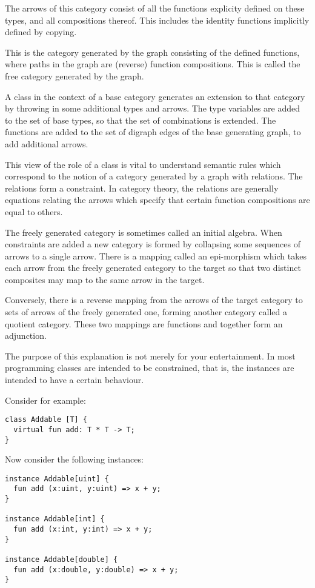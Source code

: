 \documentclass[oneside]{book}
\begin{document}
The arrows of this category
consist of all the functions explicity defined on these
types, and all compositions thereof. This includes the
identity functions implicitly defined by copying.

This is the category generated by the graph consisting
of the defined functions, where paths in the graph
are (reverse) function compositions. This is called
the free category generated by the graph.

A class in the context of a base category generates
an extension to that category by throwing in some
additional types and arrows. The type variables are added 
to the set of base types, so that the set of combinations
is extended. The functions are added to the set of digraph
edges of the base generating graph, to add additional
arrows.

This view of the role of a class is vital to understand
semantic rules which correspond to the notion of a
category generated by a graph with relations. The relations
form a constraint. In category theory, the relations are 
generally equations relating the arrows which specify that
certain function compositions are equal to others.

The freely generated category is sometimes called an
initial algebra. When constraints are added a new
category is formed by collapsing some sequences of
arrows to a single arrow. There is a mapping called
an epi-morphism which takes each arrow from the freely
generated category to the target so that two distinct
composites may map to the same arrow in the target. 

Conversely, there is a reverse mapping from the arrows
of the target category to sets of arrows of the freely
generated one, forming another category called a quotient
category. These two mappings are functions and together
form an adjunction.

The purpose of this explanation is not merely for your
entertainment. In most programming classes are intended
to be constrained, that is, the instances are intended
to have a certain behaviour. 

Consider for example:

\begin{verbatim}
class Addable [T] {
  virtual fun add: T * T -> T;
}
\end{verbatim}

Now consider the following instances:

\begin{verbatim}
instance Addable[uint] {
  fun add (x:uint, y:uint) => x + y;
}

instance Addable[int] {
  fun add (x:int, y:int) => x + y;
}

instance Addable[double] {
  fun add (x:double, y:double) => x + y;
}
\end{verbatim}
\end{document}
